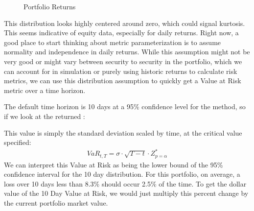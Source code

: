 \documentclass[letterpaper,10pt,english]{sphinxmanual}
\begin{document}
\begin{figure}[htbp]
\centering
\capstart

\noindent{}
\caption{Portfolio Returns}\label{\detokenize{gettingstarted:id2}}\end{figure}

\sphinxAtStartPar
This distribution looks highly centered around zero, which could signal
kurtosis. This seems indicative of equity data, especially for daily
returns. Right now, a good place to start thinking about metric
parameterization is to assume normality and independence in daily
returns. While this assumption might not be very good or might vary
between security to security in the portfolio, which we can account for
in simulation or purely using historic returns to calculate risk
metrics, we can use this distribution assumption to quickly get a Value
at Risk metric over a time horizon.

\sphinxAtStartPar
The default time horizon is 10 days at a 95\% confidence level for the
 method, so if we look at the returned
:

\begin{sphinxVerbatim}[commandchars=\\\{\}]
\end{sphinxVerbatim}

\sphinxAtStartPar
This value is simply the standard deviation scaled by time, at the
critical value specified:
\begin{equation*}
\begin{split}VaR_{t, T} = \sigma \cdot \sqrt{T-t} \cdot Z^{*}_{p = \alpha}\end{split}
\end{equation*}
\sphinxAtStartPar
We can interpret this Value at Risk as being the lower bound of the 95\%
confidence interval for the 10 day distribution. For this portfolio, on
average, a loss over 10 days less than 8.3\% should occur 2.5\% of the
time. To get the dollar value of the 10 Day Value at Risk, we would just
multiply this percent change by the current portfolio market value.

\begin{sphinxVerbatim}[commandchars=\\\{\}]
      
\end{sphinxVerbatim}
\end{document}
